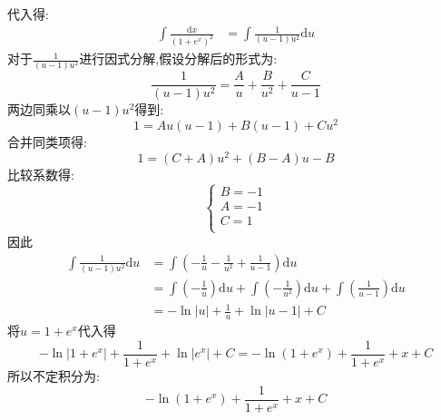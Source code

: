 \begin{questions}
\begin{solution}
		代入得:
		\begin{align*}
			\int\frac{\mathrm{d}x}{(1+e^x)^2} & = \int\frac{1}{(u-1)u^2}\mathrm{d}u
		\end{align*}
		对于$\frac{1}{(u-1)u^2}$进行因式分解,假设分解后的形式为:
		\begin{equation*}
			\frac{1}{(u-1)u^2} = \frac{A}{u} + \frac{B}{u^2} + \frac{C}{u-1}
		\end{equation*}
		两边同乘以$(u-1)u^2$得到:
		\begin{equation*}
			1 = Au(u-1) + B(u-1) + Cu^2
		\end{equation*}
		合并同类项得:
		\begin{equation*}
			1 = (C+A)u^2 + (B-A)u - B
		\end{equation*}
		比较系数得:
		\begin{equation*}
			\begin{cases}
				B = -1 \\
				A = -1 \\
				C = 1  \\
			\end{cases}
		\end{equation*}
		因此
		\begin{align*}
			\int\frac{1}{(u-1)u^2}\mathrm{d}u
			 & = \int\left(-\frac{1}{u} - \frac{1}{u^2} + \frac{1}{u-1}\right)\mathrm{d}u \\
			 & = \int\left(-\frac1u\right)\mathrm{d}u +
			\int\left(-\frac1{u^2}\right)\mathrm{d}u +
			\int\left(\frac1{u-1}\right)\mathrm{d}u                                       \\
			 & = -\ln|u| + \frac1u + \ln|u-1| + C
		\end{align*}
		将$u=1+e^x$代入得
		\begin{equation*}
			-\ln|1+e^x| + \frac{1}{1+e^x} + \ln|e^x| + C
			= -\ln(1+e^x) + \frac{1}{1+e^x} + x + C
		\end{equation*}
		所以不定积分为:
		{
		\boldmath
		\color{blue}
		\begin{equation*}
			-\ln(1+e^x) + \frac{1}{1+e^x} + x + C
		\end{equation*}
		}
	\end{solution}
\end{questions}
